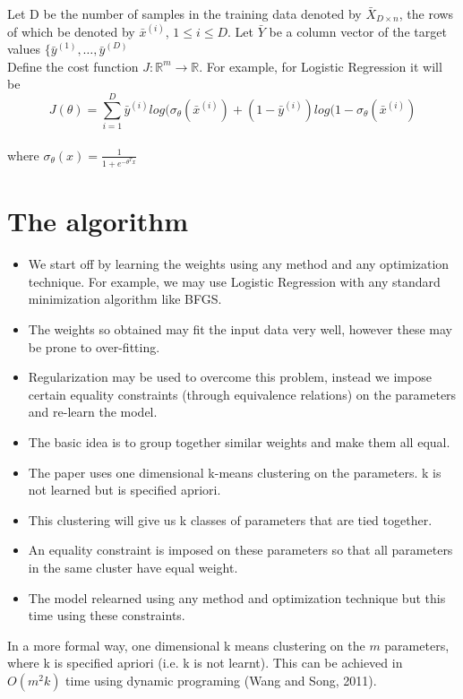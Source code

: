 \documentclass[conference]{IEEEtran}
\begin{document}
Let D be the number of samples in the training data denoted by $\bar{X}_{D\times n}$, the rows of which be denoted by $\bar{x}^{(i)}$, $1\leq i \leq D$. Let $\bar{Y}$ be a column vector of the target values $\{\bar{y}^{(1)},\dots,\bar{y}^{(D)}$ \\


Define the cost function $J:\mathbb{R}^{m}\rightarrow\mathbb{R}$. For example, for Logistic Regression it will be $$J(\theta)=\sum_{i=1}^{D}\bar{y}^{(i)}log(\sigma_\theta(\bar{x}^{(i)}) + (1-\bar{y}^{(i)})log(1 - \sigma_\theta(\bar{x}^{(i)})$$\\ where $\sigma_\theta(x)=\frac{1}{1+e^{-\theta^{T}x}}$\\

\section{The algorithm}
\begin{itemize}
    \item We start off by learning the weights using any method and any optimization technique. For example, we may use Logistic Regression with any standard minimization algorithm like BFGS. 
    \item The weights so obtained may fit the input data very well, however these may be prone to over-fitting.
    \item Regularization may be used to overcome this problem, instead we impose certain equality constraints (through equivalence relations) on the parameters and re-learn the model.
    \item The basic idea is to group together similar weights and make them all equal.
    \item The paper uses one dimensional k-means clustering on the parameters. k is not learned but is specified apriori.
    \item This clustering will give us k classes of parameters that are tied together. 
    \item An equality constraint is imposed on these parameters so that all parameters in the same cluster have equal weight.
    \item The model relearned using any method and optimization technique but this time using these constraints.
\end{itemize}
    
In a more formal way, one dimensional k means clustering on the $m$ parameters, where k is specified apriori (i.e. k is not learnt). This can be achieved in $O(m^2k)$ time using dynamic programing (Wang and Song, 2011).\\
\end{document}
